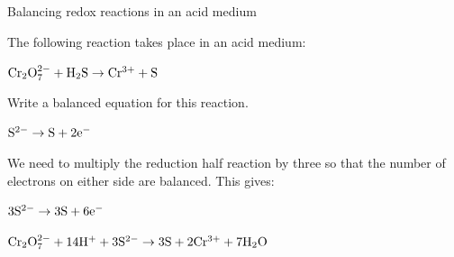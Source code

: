 \begin{wex}{Balancing redox reactions in an acid medium\\}{The following reaction takes place in an acid medium:

\begin{center}
$\rm{Cr_{2}O_{7}^{2-} + H_{2}S \rightarrow Cr^{3+} + S}$
\end{center}

Write a balanced equation for this reaction.\\}
{\begin{center}
$\rm{S^{2-} \rightarrow S + 2e^{-}}$\\
\end{center}

We need to multiply the reduction half reaction by three so that the number of electrons on either side are balanced. This gives:

\begin{center}
$\rm{3S^{2-} \rightarrow 3S + 6e^{-}}$\\
\end{center}

\begin{center}
$\rm{Cr_{2}O_{7}^{2-} + 14H^{+} + 3S^{2-} \rightarrow 3S + 2Cr^{3+} + 7H_{2}O}$\\
\end{center}
}
\end{wex}

